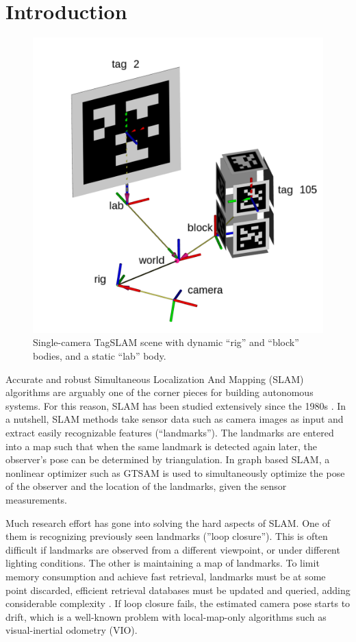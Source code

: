 \section{Introduction}
\begin{figure}[ht]
  \centering
  \includegraphics[width=0.8\columnwidth]{scene_with_block.png}
  \caption{Single-camera TagSLAM scene with dynamic ``rig'' and ``block''
    bodies, and a static ``lab'' body.}
  \label{fig:scene_with_block}
\end{figure}

Accurate and robust Simultaneous Localization And Mapping (SLAM)
algorithms are arguably one of the corner pieces for building
autonomous systems. For this reason, SLAM has been studied extensively
since the 1980s \cite{cadena2016}. 
In a nutshell, SLAM methods take sensor data such as camera images as
input and extract easily recognizable features (``landmarks''). The
landmarks are entered into a map such that when the same landmark is
detected again later, the observer's pose can be determined by
triangulation. In graph based SLAM, a nonlinear optimizer such as
GTSAM \cite{kaess2011} is used to simultaneously optimize the pose of
the observer and the location of the landmarks, given the sensor
measurements.

Much research effort \cite{cadena2016} has gone into solving the
hard aspects of SLAM. One of them is recognizing previously seen
landmarks (''loop closure''). This is often difficult if landmarks are
observed from a different viewpoint, or under different lighting
conditions. The other is maintaining a map of landmarks. To limit memory 
consumption and achieve fast retrieval, landmarks must be at some
point discarded, efficient retrieval databases must be updated and
queried, adding considerable complexity \cite{murartal2017}. If loop
closure fails, the estimated camera pose starts to drift, which is a
well-known problem with local-map-only algorithms such as
visual-inertial odometry (VIO).

